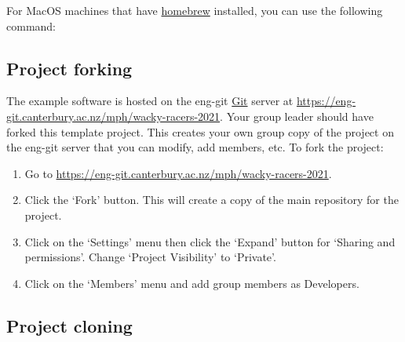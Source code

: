 \begin{Shaded}
\begin{Highlighting}[]
\KeywordTok{&&} 
\end{Highlighting}
\end{Shaded}

For MacOS machines that have \href{https://brew.sh}{homebrew} installed,
you can use the following command:

\begin{Shaded}
\begin{Highlighting}[]
\end{Highlighting}
\end{Shaded}

\subsection{Project forking}
\label{project-forking}

The example software is hosted on the eng-git \url{Git} server at
\href{https://eng-git.canterbury.ac.nz/mph/wacky-racers-2021}{\url{https://eng-git.canterbury.ac.nz/mph/wacky-racers-2021}}.
Your group leader should have forked this template project. This creates
your own group copy of the project on the eng-git server that you can
modify, add members, etc. To fork the project:

\begin{enumerate}
\item
  Go to
  \href{https://eng-git.canterbury.ac.nz/mph/wacky-racers-2021}{\url{https://eng-git.canterbury.ac.nz/mph/wacky-racers-2021}}.
\item
  Click the `Fork' button. This will create a copy of the main repository
  for the project.
\item
  Click on the `Settings' menu then click the `Expand' button for
  `Sharing and permissions'. Change `Project Visibility' to `Private'.
\item
  Click on the `Members' menu and add group members as Developers.
\end{enumerate}

\subsection{Project cloning}
\label{project-cloning}

